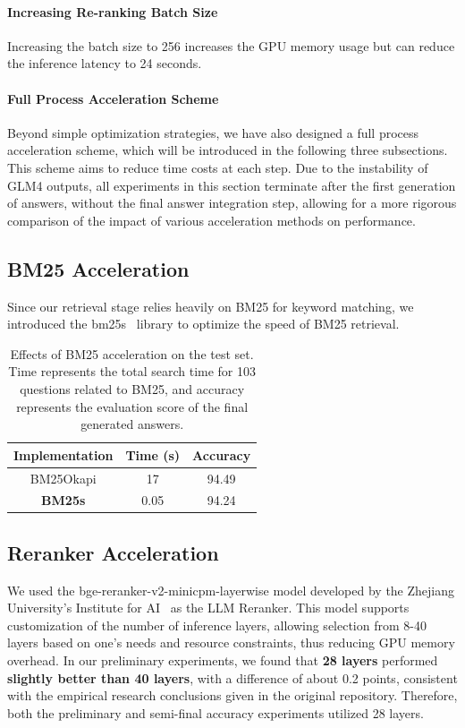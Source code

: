 \documentclass[11pt]{article}
\begin{document}
\paragraph{Increasing Re-ranking Batch Size} Increasing the batch size to 256 increases the GPU memory usage but can reduce the inference latency to 24 seconds.

\paragraph{Full Process Acceleration Scheme} Beyond simple optimization strategies, we have also designed a full process acceleration scheme, which will be introduced in the following three subsections. This scheme aims to reduce time costs at each step. Due to the instability of GLM4 outputs, all experiments in this section terminate after the first generation of answers, without the final answer integration step, allowing for a more rigorous comparison of the impact of various acceleration methods on performance.

\subsection{BM25 Acceleration}

Since our retrieval stage relies heavily on BM25 for keyword matching, we introduced the bm25s~\cite{bm25s} library to optimize the speed of BM25 retrieval.

\begin{table}[htp]
\small
\centering
\begin{tabular}{ccc}
\toprule
 \textbf{Implementation} & \textbf{Time (s)} & \textbf{Accuracy} \\
\midrule
BM25Okapi & 17 & 94.49 \\
\textbf{BM25s} & 0.05 & 94.24 \\
\bottomrule
\end{tabular}
\caption{Effects of BM25 acceleration on the test set. Time represents the total search time for 103 questions related to BM25, and accuracy represents the evaluation score of the final generated answers.}
 \label{tab:eval}
\end{table}

\subsection{Reranker Acceleration}
We used the bge-reranker-v2-minicpm-layerwise model developed by the Zhejiang University's Institute for AI~\cite{chen2024bge} as the LLM Reranker. This model supports customization of the number of inference layers, allowing selection from 8-40 layers based on one's needs and resource constraints, thus reducing GPU memory overhead. In our preliminary experiments, we found that \textbf{28 layers} performed \textbf{slightly better than 40 layers}, with a difference of about 0.2 points, consistent with the empirical research conclusions given in the original repository. Therefore, both the preliminary and semi-final accuracy experiments utilized 28 layers.
\end{document}
